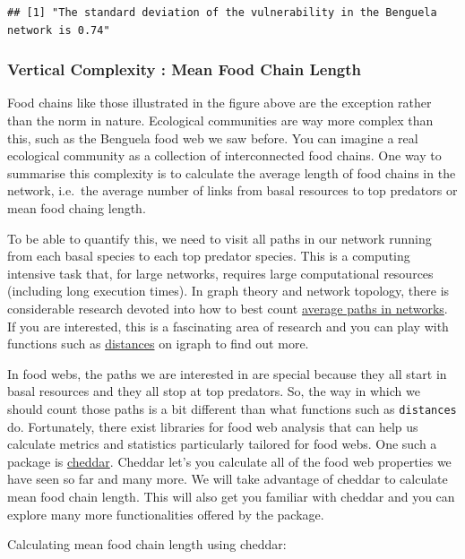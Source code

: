 \documentclass[
]{article}
\begin{document}
\begin{verbatim}
## [1] "The standard deviation of the vulnerability in the Benguela network is 0.74"
\end{verbatim}

\subsubsection{Vertical Complexity : Mean Food Chain
Length}\label{vertical-complexity-mean-food-chain-length}

Food chains like those illustrated in the figure above are the exception
rather than the norm in nature. Ecological communities are way more
complex than this, such as the Benguela food web we saw before. You can
imagine a real ecological community as a collection of interconnected
food chains. One way to summarise this complexity is to calculate the
average length of food chains in the network, i.e.~the average number of
links from basal resources to top predators or mean food chaing length.

To be able to quantify this, we need to visit all paths in our network
running from each basal species to each top predator species. This is a
computing intensive task that, for large networks, requires large
computational resources (including long execution times). In graph
theory and network topology, there is considerable research devoted into
how to best count
\href{https://en.wikipedia.org/wiki/Average_path_length}{average paths
in networks}. If you are interested, this is a fascinating area of
research and you can play with functions such as
\href{https://igraph.org/r/doc/distances.html}{distances} on igraph to
find out more.

In food webs, the paths we are interested in are special because they
all start in basal resources and they all stop at top predators. So, the
way in which we should count those paths is a bit different than what
functions such as \texttt{distances} do. Fortunately, there exist
libraries for food web analysis that can help us calculate metrics and
statistics particularly tailored for food webs. One such a package is
\href{http://quicklizard99.github.io/cheddar/}{cheddar}. Cheddar let's
you calculate all of the food web properties we have seen so far and
many more. We will take advantage of cheddar to calculate mean food
chain length. This will also get you familiar with cheddar and you can
explore many more functionalities offered by the package.

Calculating mean food chain length using cheddar:
\end{document}

